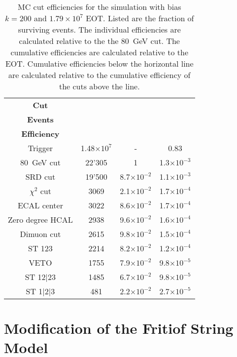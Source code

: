 \begin{table}[htbp]
	\centering
	\caption[MC cut efficiencies for the simulation with bias $k=200$ and $1.79\times10^7$ EOT.]{MC cut efficiencies for the simulation with bias $k=200$ and $1.79\times10^7$ EOT. Listed are the fraction of surviving events. The individual efficiencies are calculated relative to the the 80~GeV cut. The cumulative efficiencies are calculated relative to the EOT. Cumulative efficiencies below the horizontal line are calculated relative to the cumulative efficiency of the cuts above the line.}
	\begin{tabular}{|cccc|}
		\toprule
		\textbf{Cut} & \thead{\textbf{Surviving}\\\textbf{Events}} & \thead{\textbf{Efficiency}}& \thead{\textbf{Cumulative}\\\textbf{Efficiency}}\\
		\midrule
		Trigger & 1.48$\times10^{7}$ & - & 0.83\\ 
		80~GeV cut & 22'305 & 1 & 1.3$\times 10^{-3}$\\
		SRD cut & 19'500 & 8.7$\times 10^{-2}$ & 1.1$\times 10^{-3}$\\
		$\chi^2$ cut & 3069 & 2.1$\times 10^{-2}$ & 1.7$\times 10^{-4}$\\
		ECAL center & 3022 & 8.6$\times 10^{-2}$ & 1.7$\times 10^{-4}$\\
		Zero degree HCAL & 2938 & 9.6$\times 10^{-2}$ & 1.6$\times 10^{-4}$\\
		Dimuon cut & 2615 & 9.8$\times 10^{-2}$ & 1.5$\times 10^{-4}$\\
		\midrule
		ST 123 & 2214 & 8.2$\times 10^{-2}$ & 1.2$\times 10^{-4}$\\
		VETO & 1755 & 7.9$\times 10^{-2}$ & 9.8$\times 10^{-5}$\\
		ST 12|23 & 1485 & 6.7$\times 10^{-2}$ & 9.8$\times 10^{-5}$\\
		ST 1|2|3 & 481 & 2.2$\times 10^{-2}$ & 2.7$\times 10^{-5}$\\
		\bottomrule
	\end{tabular}
	\label{res:Tab:mccuts}
      \end{table}

\FloatBarrier\noindent
\section{Modification of the Fritiof String Model}
\label{appC:sec:ftfp-modifications}

